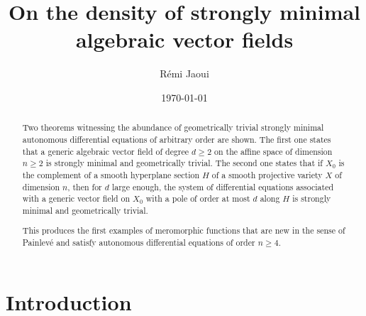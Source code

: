 \documentclass[12pt]{amsart}
\title[Strongly minimal vector fields]{On the density of strongly minimal  algebraic vector fields}
\author{Rémi Jaoui}
\date\today
\theoremstyle{definition}
\theoremstyle{plain}
\theoremstyle{exampstyle}
\theoremstyle{exampstyle}\newtheorem{thmxbis}{Theorem}
\numberwithin{equation}{section}
\theoremstyle{remark}
\begin{document}
\maketitle


\begin{abstract} 
Two theorems witnessing the abundance of geometrically trivial strongly minimal autonomous differential equations of arbitrary order are shown. The first one states that a generic algebraic vector field of degree $d\geq 2$  on the affine space of dimension $n \geq 2$ is strongly minimal and geometrically trivial. The second one states that if $X_0$ is the complement of a smooth hyperplane section $H$ of a smooth projective variety $X$ of dimension $n$, then for $d$ large enough, the system of differential equations associated with a generic vector field on $X_0$ with a pole of order at most $d$ along $H$ is strongly minimal and geometrically trivial. 

This produces the first examples of meromorphic functions that are new in the sense of Painlevé and satisfy autonomous differential equations of order $n \geq 4$.
\end{abstract} 

%
%

\setcounter{tocdepth}{1}
\tableofcontents

\section{Introduction} 
 
\end{document}
